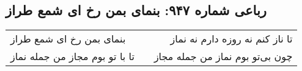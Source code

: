 \begin{center}
\section*{رباعی شماره ۹۴۷: بنمای بمن رخ ای شمع طراز}
\label{sec:0947}
\begin{longtable}{l p{0.5cm} r}
بنمای بمن رخ ای شمع طراز
&&
تا ناز کنم نه روزه دارم نه نماز
\\
تا با تو بوم مجاز من جمله نماز
&&
چون بی‌تو بوم نماز من جمله مجاز
\\
\end{longtable}
\end{center}
